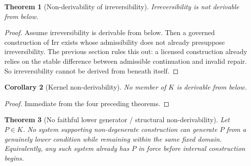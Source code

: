 \documentclass[11pt]{article}
\newtheorem{theorem}{Theorem}[section]
\newtheorem{corollary}[theorem]{Corollary}
\theoremstyle{definition}
\theoremstyle{remark}
\newcommand{\Irr}{\mathrm{Irr}}
\begin{document}
\begin{theorem}[Non-derivability of irreversibility]
Irreversibility is not derivable from below.
\end{theorem}

\begin{proof}
Assume irreversibility is derivable from below. Then a governed construction of $\Irr$ exists whose admissibility does not already presuppose irreversibility. The previous section rules this out: a licensed construction already relies on the stable difference between admissible continuation and invalid repair. So irreversibility cannot be derived from beneath itself.
\end{proof}

\begin{corollary}[Kernel non-derivability]\label{cor:kernel-non-derivability}
No member of $K$ is derivable from below.
\end{corollary}

\begin{proof}
Immediate from the four preceding theorems.
\end{proof}

\begin{theorem}[No faithful lower generator / structural non-derivability]\label{thm:kernel-no-lower-generator}
Let $P \in K$. No system supporting non-degenerate construction can generate $P$ from a genuinely lower condition while remaining within the same fixed domain. Equivalently, any such system already has $P$ in force before internal construction begins.
\end{theorem}
\end{document}
